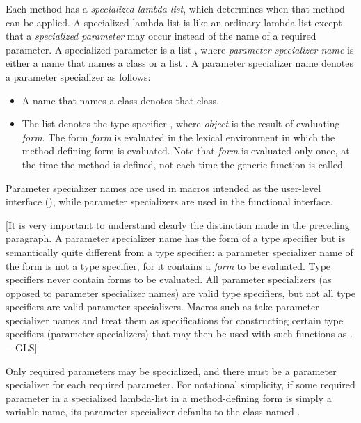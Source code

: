 Each method has a \emph{specialized lambda-list}, which determines
when that method can be applied.  A specialized lambda-list is like
an ordinary lambda-list except that a \emph{specialized parameter\/}
may occur instead of the name of a required parameter.  A specialized parameter
is a list ,
where \emph{parameter-specializer-name\/} is either
a name that names a class or a list .
A parameter specializer name denotes a parameter specializer as follows:

\begin{itemize}
\item  A name that names a class denotes that class.

\item  The list  denotes the type specifier
, where \emph{object\/} is the result of
evaluating \emph{form\/}.  The form \emph{form\/} is evaluated in the
lexical environment in which the method-defining form is
evaluated.  Note that \emph{form\/} is evaluated only once, at the time
the method is defined, not each time the generic function is called.
\end{itemize}

Parameter specializer names are used in macros intended as the
user-level interface (), while parameter specializers
are used in the functional interface.

[It is very important to understand clearly the distinction made
in the preceding paragraph.  A parameter specializer name
has the form of a type specifier but is semantically quite different
from a type specifier: a parameter specializer name of the form
 is not a type specifier, for it contains
a \emph{form\/} to be evaluated.   Type specifiers
never contain forms to be evaluated.  All parameter specializers
(as opposed to parameter specializer names) are valid type specifiers,
but not all type specifiers are valid parameter specializers.  Macros such as 
take parameter specializer names and treat them as specifications for
constructing certain type specifiers (parameter specializers) that may then be used
with such functions as .---GLS]


Only required parameters may be specialized, and there must be a
parameter specializer for each required parameter.  For notational
simplicity, if some required parameter in a specialized lambda-list in
a method-defining form is simply a variable name, its parameter
specializer defaults to the class named .

